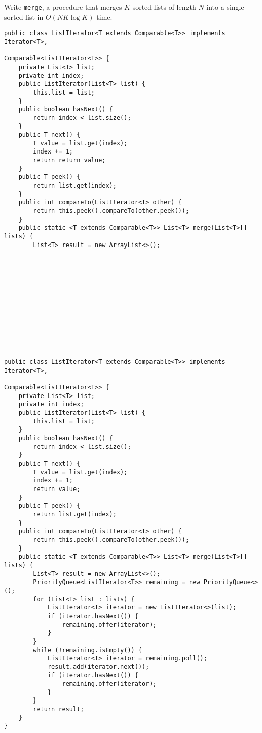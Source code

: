 \begin{blocksection}
\question Write \lstinline$merge$, a procedure that merges $K$ sorted lists of
length $N$ into a single sorted list in $O(NK \log K)$ time.

\ifprintanswers
\else
\begin{lstlisting}
public class ListIterator<T extends Comparable<T>> implements Iterator<T>,
                                                              Comparable<ListIterator<T>> {
    private List<T> list;
    private int index;
    public ListIterator(List<T> list) {
        this.list = list;
    }
    public boolean hasNext() {
        return index < list.size();
    }
    public T next() {
        T value = list.get(index);
        index += 1;
        return return value;
    }
    public T peek() {
        return list.get(index);
    }
    public int compareTo(ListIterator<T> other) {
        return this.peek().compareTo(other.peek());
    }
    public static <T extends Comparable<T>> List<T> merge(List<T>[] lists) {
        List<T> result = new ArrayList<>();













\end{lstlisting}
\fi

\begin{solution}
\begin{lstlisting}
public class ListIterator<T extends Comparable<T>> implements Iterator<T>,
                                                              Comparable<ListIterator<T>> {
    private List<T> list;
    private int index;
    public ListIterator(List<T> list) {
        this.list = list;
    }
    public boolean hasNext() {
        return index < list.size();
    }
    public T next() {
        T value = list.get(index);
        index += 1;
        return value;
    }
    public T peek() {
        return list.get(index);
    }
    public int compareTo(ListIterator<T> other) {
        return this.peek().compareTo(other.peek());
    }
    public static <T extends Comparable<T>> List<T> merge(List<T>[] lists) {
        List<T> result = new ArrayList<>();
        PriorityQueue<ListIterator<T>> remaining = new PriorityQueue<>();
        for (List<T> list : lists) {
            ListIterator<T> iterator = new ListIterator<>(list);
            if (iterator.hasNext()) {
                remaining.offer(iterator);
            }
        }
        while (!remaining.isEmpty()) {
            ListIterator<T> iterator = remaining.poll();
            result.add(iterator.next());
            if (iterator.hasNext()) {
                remaining.offer(iterator);
            }
        }
        return result;
    }
}
\end{lstlisting}
\end{solution}
\end{blocksection}
